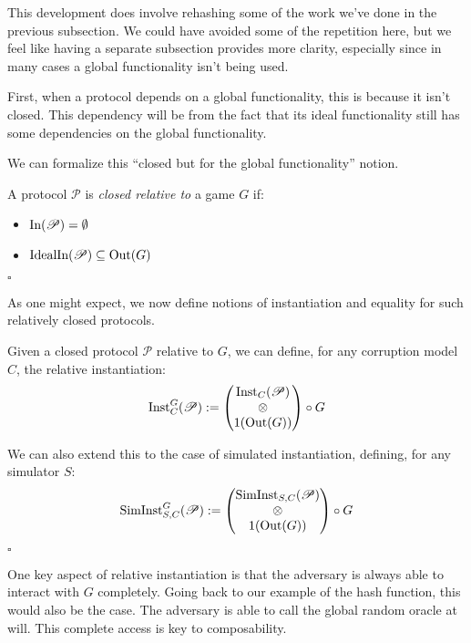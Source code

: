 This development does involve rehashing some of the work
we've done in the previous subsection.
We could have avoided some of the repetition here,
but we feel like having a separate subsection provides more clarity,
especially since in many cases a global functionality isn't being used.

First, when a protocol depends on a global functionality,
this is because it isn't closed.
This dependency will be from the fact that its ideal functionality
still has some dependencies on the global functionality.

We can formalize this ``closed but for the global functionality''
notion.

\begin{definition}
  A protocol $\mathscr{P}$ is \emph{closed relative to} a game $G$
  if:
  \begin{itemize}
    \item $\text{In}(\mathscr{P}) = \emptyset$
    \item $\text{IdealIn}(\mathscr{P}) \subseteq \text{Out}(G)$
  \end{itemize} 

  $\square$
\end{definition}

As one might expect, we now define notions of instantiation
and equality for such relatively closed protocols.

\begin{definition}
  Given a closed protocol $\mathscr{P}$ relative to $G$, we can define,
  for any corruption model $C$,
  the relative instantiation:
  $$
  \text{Inst}_{C}^G(\mathscr{P}) :=
  \begin{pmatrix}
    \text{Inst}_C(\mathscr{P})\cr
    \otimes\cr
    1(\text{Out}(G))
  \end{pmatrix}
  \circ G
  $$

  We can also extend this to the case of simulated instantiation,
  defining, for any simulator $S$:
  $$
  \text{SimInst}_{S, C}^G(\mathscr{P}) :=
  \begin{pmatrix}
    \text{SimInst}_{S, C}(\mathscr{P})\cr
    \otimes\cr
    1(\text{Out}(G))
  \end{pmatrix}
  \circ G
  $$

  $\square$
\end{definition}

One key aspect of relative instantiation is that the adversary
is always able to interact with $G$ completely.
Going back to our example of the hash function,
this would also be the case.
The adversary is able to call the global random oracle at will.
This complete access is key to composability.

